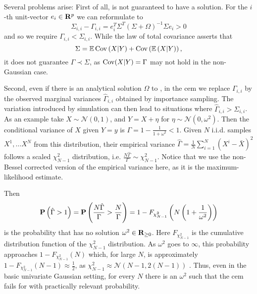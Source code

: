 Several problems arise: First of all,  is not guaranteed to have a solution. For the $i$-th unit-vector $e_{i}\in\R^{p}$ we can reformulate  to 
$$
\Sigma_{i,i} - \Gamma_{i,i} = e_{i}^T\Sigma^{T} \left( \Sigma + \Omega \right)^{-1}\Sigma e_{i} > 0
$$
and so we require $\Gamma_{i,i} < \Sigma_{i,i}$. While the law of total covariance asserts that
$$
\Sigma = \E \cov \left( X | Y \right) + \cov \left( \E \left( X | Y \right) \right),
$$
it does not guarantee $\Gamma \prec \Sigma$, as $\cov(X|Y) = \Gamma$ may not hold in the non-Gaussian case.

Second, even if there is an analytical solution $\Omega$ to , in the \gls{cem} we replace $\Gamma_{i,i}$ by the observed marginal variances $\hat\Gamma_{i,i}$ obtained by importance sampling. The variation introduced by simulation can then lead to situations where $\hat\Gamma_{i,i} > \Sigma_{i,i}$. As an example take $X \sim \mathcal N(0, 1)$, and $Y = X + \eta$ for $\eta \sim \mathcal N(0, \omega^{2})$. Then the conditional variance of $X$ given $Y = y$ is $\Gamma = 1 - \frac{1}{1 + \omega^{2}} < 1$. Given $N$ i.i.d. samples $X^{1}, \dots X^{N}$ from this distribution, their empirical variance $\hat \Gamma = \frac{1}{N} \sum_{i = 1}^{N} (X^{i} - \bar X)^{2} $ follows a scaled $\chi_{N - 1}^{2}$ distribution, i.e. $ \frac{N\hat\Gamma}{\Gamma} \sim \chi^{2}_{N - 1}$. Notice that we use the non-Bessel corrected version of the empirical variance here, as it is the maximum-likelihood estimate. 

Then $$\P \left( \hat \Gamma > 1 \right) = \P \left( \frac{N \hat \Gamma}{\Gamma} > \frac{N}{\Gamma} \right) = 1 - F_{\chi^{2}_{N-1}} \left( N \left( 1 + \frac{1}{\omega^{2}} \right) \right)$$ is the probability that  has no solution $\omega^{2} \in \R_{\geq 0}$. Here $F_{\chi^{2}_{N - 1}}$ is the cumulative distribution function of the $\chi^{2}_{N - 1}$ distribution. As $\omega^{2}$ goes to $\infty$, this probability approaches $1 - F_{\chi^{2}_{N - 1}}(N)$ which, for large $N$, is approximately $1 - F_{\chi^{2}_{N - 1}} (N - 1) \approx \frac{1}{2}$, as $\chi^{2}_{N-1} \approx \mathcal N\left(N - 1, 2 (N-1)\right)$ \citep[Section 18.5]{Johnson1994Continuous}.
Thus, even in the basic univariate Gaussian setting, for every $N$ there is an $\omega^{2}$ such that the \gls{cem} fails for  with practically relevant probability. 

